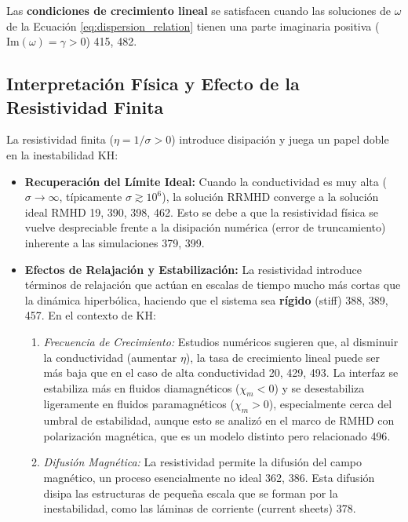Las \textbf{condiciones de crecimiento lineal} se satisfacen cuando las soluciones de $\omega$ de la Ecuación \ref{eq:dispersion_relation} tienen una parte imaginaria positiva ($\text{Im}(\omega) = \gamma > 0$) {415, 482}.

\subsection{Interpretación Física y Efecto de la Resistividad Finita}

La resistividad finita ($\eta = 1/\sigma > 0$) introduce disipación y juega un papel doble en la inestabilidad KH:

\begin{itemize}
    \item \textbf{Recuperación del Límite Ideal:} Cuando la conductividad es muy alta ($\sigma \to \infty$, típicamente $\sigma \gtrsim 10^6$), la solución RRMHD converge a la solución ideal RMHD {19, 390, 398, 462}. Esto se debe a que la resistividad física se vuelve despreciable frente a la disipación numérica (error de truncamiento) inherente a las simulaciones {379, 399}.
    \item \textbf{Efectos de Relajación y Estabilización:} La resistividad introduce términos de relajación que actúan en escalas de tiempo mucho más cortas que la dinámica hiperbólica, haciendo que el sistema sea \textbf{rígido} (stiff) {388, 389, 457}. En el contexto de KH:
    \begin{enumerate}
        \item \textit{Frecuencia de Crecimiento:} Estudios numéricos sugieren que, al disminuir la conductividad (aumentar $\eta$), la tasa de crecimiento lineal puede ser más baja que en el caso de alta conductividad {20, 429, 493}. La interfaz se estabiliza más en fluidos diamagnéticos ($\chi_m < 0$) y se desestabiliza ligeramente en fluidos paramagnéticos ($\chi_m > 0$), especialmente cerca del umbral de estabilidad, aunque esto se analizó en el marco de RMHD con polarización magnética, que es un modelo distinto pero relacionado {496}.
        \item \textit{Difusión Magnética:} La resistividad permite la difusión del campo magnético, un proceso esencialmente no ideal {362, 386}. Esta difusión disipa las estructuras de pequeña escala que se forman por la inestabilidad, como las láminas de corriente (current sheets) {378}.

    \end{enumerate}
\end{itemize}

